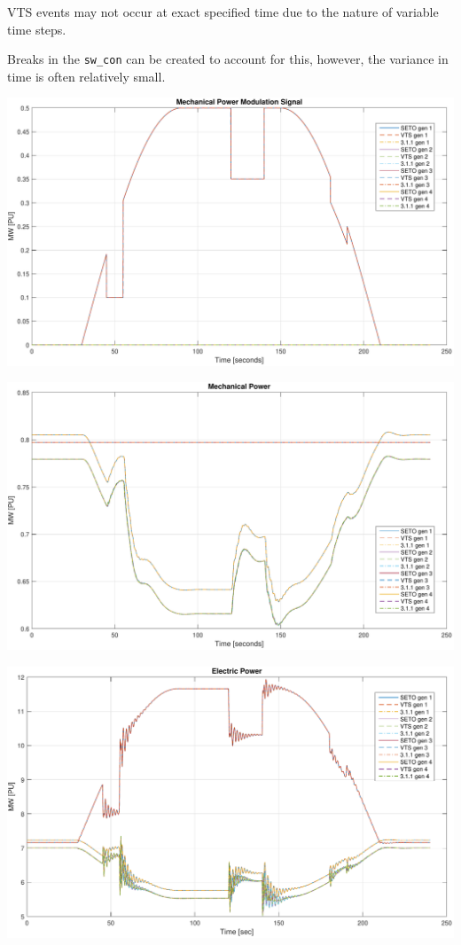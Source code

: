 \documentclass[12pt]{article}
\begin{document}
VTS events may not occur at exact specified time due to the nature of variable time steps.

Breaks in the \verb|sw_con| can be created to account for this, however, the variance in time is often relatively small.



\includegraphics[width=\linewidth]{verPmSig}

\includegraphics[width=\linewidth]{verPmech}

\includegraphics[width=\linewidth]{verPelect}
\end{document}
